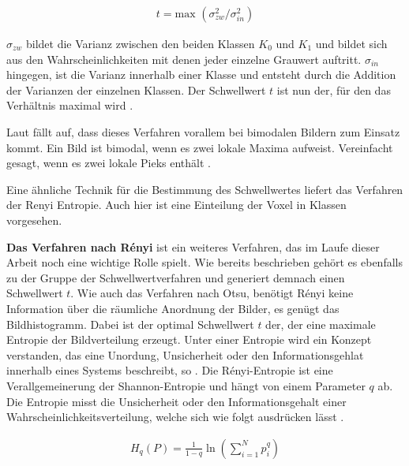 \begin{align}
	t = \text{max }(\sigma_{zw}^{2}/ \sigma_{in}^{2})
\end{align}

$\sigma_{zw}$ bildet die Varianz zwischen den beiden Klassen $K_{0}$ und $K_{1}$
und bildet sich aus den Wahrscheinlichkeiten mit denen jeder einzelne Grauwert
auftritt. $\sigma_{in}$ hingegen, ist die Varianz innerhalb einer Klasse und
entsteht durch die Addition der Varianzen der einzelnen Klassen. Der Schwellwert
$t$ ist nun der, für den das Verhältnis maximal wird \citep[vgl.][S.~264]{lehmann2013bildverarbeitung}.

Laut \citet[S.~264]{lehmann2013bildverarbeitung} fällt auf, dass dieses Verfahren
vorallem bei bimodalen Bildern zum Einsatz kommt. Ein Bild ist bimodal, wenn es zwei
lokale Maxima aufweist. Vereinfacht gesagt, wenn es zwei lokale Pieks enthält \citep[vgl.][S.~264]{lehmann2013bildverarbeitung}.

Eine ähnliche Technik für die Bestimmung des Schwellwertes liefert das Verfahren
der Renyi Entropie. Auch hier ist eine Einteilung der Voxel in Klassen vorgesehen.
\pagebreak

\textbf{Das Verfahren nach Rényi} ist ein weiteres Verfahren, das im Laufe dieser
Arbeit noch eine wichtige Rolle spielt. Wie bereits beschrieben gehört es
ebenfalls zu der Gruppe der Schwellwertverfahren und generiert demnach einen
Schwellwert $t$. Wie auch das Verfahren nach Otsu, benötigt Rényi keine
Information über die räumliche Anordnung der Bilder, es genügt das Bildhistogramm.
Dabei ist der optimal Schwellwert $t$ der, der eine maximale Entropie der Bildverteilung
erzeugt. Unter einer Entropie wird ein Konzept verstanden, das eine Unordung,
Unsicherheit oder den Informationsgehlat innerhalb eines Systems beschreibt, so \citet[S.~102]{bein2006}.
Die Rényi-Entropie ist eine Verallgemeinerung der Shannon-Entropie und hängt von
einem Parameter $q$ ab. Die Entropie misst die Unsicherheit oder den
Informationsgehalt einer Wahrscheinlichkeitsverteilung, welche sich wie folgt ausdrücken
lässt \citep[vgl.][K.~2]{bromiley2004}.

\begin{align}
	\label{equ:renyi}H_{q}(P) = \frac{1}{1-q}\ln \left( \sum_{i=1}^{N}p_{i}^{q}\right)
\end{align}

